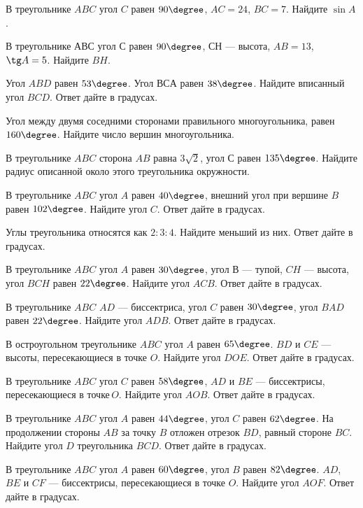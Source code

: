 \begin{class}[number=4]
	\begin{listofex}
		\item В треугольнике \( ABC \) угол \( C \) равен \( 90\degree \), \( AC  =  24 \), \( BC  =  7 \). Найдите  \( \sin A \).
		\item В треугольнике \( АВС \) угол \( С \) равен \( 90\degree \), \( СН \) --- высота, \( AB = 13 \),  \( \tg A = 5 \). Найдите \( BH \).
		\item Угол \( ABD \) равен \( 53\degree \). Угол \( ВСА  \) равен \( 38\degree \). Найдите вписанный угол \( BCD \). Ответ дайте в градусах.
		\item Угол между двумя соседними сторонами правильного многоугольника, равен \( 160\degree \). Найдите число вершин многоугольника.
		\item В треугольнике \( ABC \) сторона \( AB \) равна \( 3 \sqrt{2} \), угол \( С \) равен \( 135\degree \). Найдите радиус описанной около этого треугольника окружности.
		\item В треугольнике \( ABC \) угол \( A \) равен \( 40\degree \), внешний угол при вершине \( B \) равен \( 102\degree \). Найдите угол \( C \). Ответ дайте в градусах.
		\item Углы треугольника относятся как \( 2 : 3 : 4 \). Найдите меньший из них. Ответ дайте в градусах.
		\item В треугольнике \( ABC \) угол \( A \) равен \( 30\degree \), угол \( В \) --- тупой, \( CH \) --- высота, угол \( BCH \) равен \( 22\degree \). Найдите угол \( ACB \). Ответ дайте в градусах.
		\item В треугольнике \( ABC \) \( AD \) --- биссектриса, угол \( C \) равен \( 30\degree \), угол \( BAD \) равен \( 22\degree \). Найдите угол \( ADB \). Ответ дайте в градусах.
		\item В остроугольном треугольнике \( ABC \) угол \( A \) равен \( 65\degree \). \( BD \) и \( CE \) --- высоты, пересекающиеся в точке \( O \). Найдите угол \( DOE \). Ответ дайте в градусах.
		\item В треугольнике \( ABC \) угол \( C \) равен \( 58\degree \), \( AD \) и \( BE \) --- биссектрисы, пересекающиеся в точке \( O \). Найдите угол \( AOB \). Ответ дайте в градусах.
		\item В треугольнике \( ABC \) угол \( A \) равен \( 44\degree \), угол \( C \) равен \( 62\degree \). На продолжении стороны \( AB \) за точку \( B \) отложен отрезок \( BD \), равный стороне \( BC \). Найдите угол \( D \) треугольника \( BCD \). Ответ дайте в градусах.
		\item В треугольнике \( ABC \) угол \( A \) равен \( 60\degree \), угол \( B \) равен \( 82\degree \). \( AD \), \( BE \) и \( CF \) --- биссектрисы, пересекающиеся в точке \( O \). Найдите угол \( AOF \). Ответ дайте в градусах.
	\end{listofex}
\end{class}

